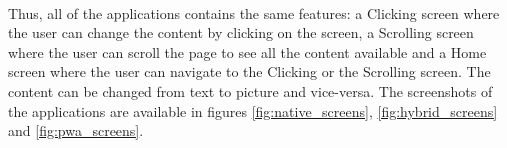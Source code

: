 \documentclass{kththesis}
\begin{document}
\paragraph{}
Thus, all of the applications contains the same features: a Clicking screen where the user can change the content by clicking on the screen, a Scrolling screen where the user can scroll the page to see all the content available and a Home screen where the user can navigate to the Clicking or the Scrolling screen. The content can be changed from text to picture and vice-versa. The screenshots of the applications are available in figures \ref{fig:native_screens}, \ref{fig:hybrid_screens} and \ref{fig:pwa_screens}.

\begin{figure}
    \centering
    \hfill
    \hfill
    \hfill

\end{figure}
\end{document}
